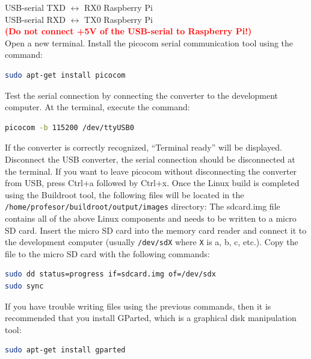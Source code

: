 \documentclass[11pt]{article}
\begin{document}
USB-serial TXD $\leftrightarrow$ RX0 Raspberry Pi \\
USB-serial RXD $\leftrightarrow$ TX0 Raspberry Pi \\
\textbf{\textcolor{red}{(Do not connect +5V of the USB-serial to Raspberry
 Pi!)}} \\
\newline
Open a new terminal. Install the picocom serial communication tool
using the command:
\begin{lstlisting}[language=bash]
sudo apt-get install picocom
\end{lstlisting}
Test the serial connection by connecting the converter to the development
 computer. At the terminal, execute the command:
\begin{lstlisting}[language=bash]
picocom -b 115200 /dev/ttyUSB0
\end{lstlisting}
If the converter is correctly recognized, “Terminal ready” will be displayed.
 Disconnect the USB converter, the serial connection should be disconnected at
 the terminal. If you want to leave picocom without disconnecting the converter
 from USB, press Ctrl+a followed by Ctrl+x.
\newline
\newline
Once the Linux build is completed using the Buildroot tool, the following files
 will be located in the \texttt{/home/profesor/buildroot/output/images} directory:
\newline
{}%
The sdcard.img file contains all of the above Linux components and needs to be
 written to a micro SD card. Insert the micro SD card into the memory card
 reader and connect it to the development computer (usually \texttt{/dev/sdX}
 where \texttt{X} is a, b, c, etc.). Copy the file to the micro SD card with
 the following commands:
\begin{lstlisting}[language=bash]
sudo dd status=progress if=sdcard.img of=/dev/sdx
sudo sync
\end{lstlisting}
If you have trouble writing files using the previous commands, then it is
 recommended that you install GParted, which is a graphical disk manipulation
 tool:
\begin{lstlisting}[language=bash]
sudo apt-get install gparted
\end{lstlisting}
\end{document}
